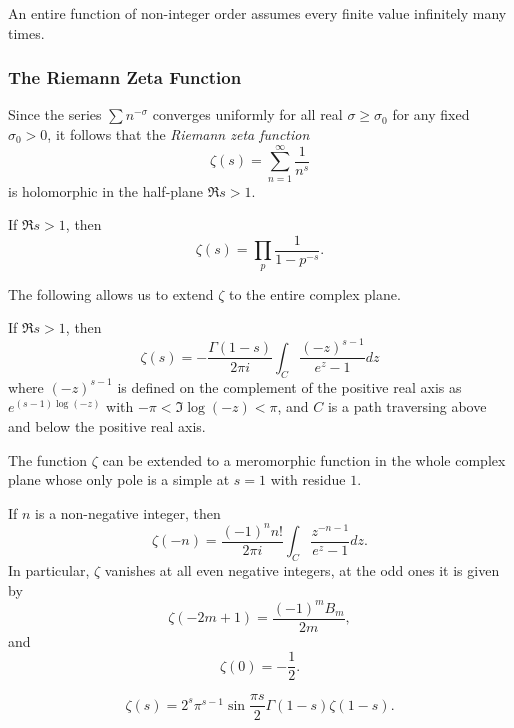 \begin{corollary}
  An entire function of non-integer order assumes every finite value infinitely many times.
\end{corollary}

\subsubsection{The Riemann Zeta Function}

Since the series $\sum n^{-\sigma}$ converges  uniformly for all real $\sigma \geq \sigma_0$ for any fixed $\sigma_0 > 0$, it follows that the \emph{Riemann zeta function}
\[
\zeta(s) = \sum_{n=1}^\infty \frac{1}{n^s}
\]
is holomorphic in the half-plane $\Re s > 1$.

\begin{theorem}
  If $\Re s > 1$, then
  \[
  \zeta(s) = \prod_p \frac{1}{1 - p^{-s}}.
  \]
\end{theorem}

The following allows us to extend $\zeta$ to the entire complex plane.

\begin{theorem}
  If $\Re s > 1$, then
  \[
  \zeta(s) = -\frac{\Gamma(1-s)}{2 \pi i} \int_C \frac{(-z)^{s-1}}{e^z-1} d z
  \]
  where $(-z)^{s-1}$ is defined on the complement of the positive real axis as $e^{(s-1)\log(-z)}$ with $-\pi < \Im\log(-z) < \pi$, and $C$ is a path traversing above and below the positive real axis.
\end{theorem}

\begin{corollary}
  The function $\zeta$ can be extended to a meromorphic function in the whole complex plane whose only pole is a simple at $s = 1$ with residue $1$.
\end{corollary}

\begin{theorem}
  If $n$ is a non-negative integer, then
  \[
  \zeta(-n) = \frac{(-1)^n n!}{2 \pi i} \int_C \frac{z^{-n-1}}{e^z - 1} d z.
  \]
  In particular, $\zeta$ vanishes at all even negative integers, at the odd ones it is given by
  \[
  \zeta(-2 m + 1) = \frac{(-1)^m B_m}{2 m},
  \]
  and
  \[
  \zeta(0) = -\frac{1}{2}.
  \]
\end{theorem}

\begin{theorem}
  \[
  \zeta(s) = 2^s \pi^{s-1} \sin\frac{\pi s}{2} \Gamma(1-s) \zeta(1-s).
  \]
\end{theorem}


